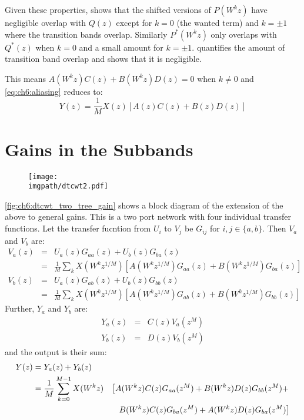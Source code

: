 Given these properties, \cite[figure 5]{kingsbury_complex_2001} shows that the
shifted versions of $P(W^k z)$ have negligible overlap with $Q(z)$ except for
$k=0$ (the wanted term) and $k=\pm 1$ where the transition bands overlap.
Similarly $P^*(W^k z)$ only overlaps with $Q^*(z)$ when $k=0$ and a small amount
for $k = \pm 1$. \cite{kingsbury_complex_2001} quantifies the amount of transition
band overlap and shows that it is negligible.

This means $A(W^k z)C(z) + B(W^k z)D(z) = 0$ when $k\neq 0$ and 
\eqref{eq:ch6:aliasing} reduces to:
\begin{equation}
  Y(z) =  \frac{1}{M} X(z)\left[ A(z)C(z) + B(z)D(z) \right]
  \label{eq:ch6:aliasing_cancel} 
\end{equation}

\section{Gains in the Subbands}
\begin{figure}[t]
  \centering
  \texttt{[image: \\imgpath/dtcwt2.pdf]}
  \label{fig:ch6:dtcwt_two_tree_gain}
\end{figure}

\autoref{fig:ch6:dtcwt_two_tree_gain} shows a block diagram of the extension of 
the above to general gains. This is a two port network with four individual
transfer functions. Let the transfer fucntion from $U_i$ to $V_j$
be $G_{ij}$ for $i, j \in \{a, b\}$. Then $V_a$ and $V_b$ are:
\begin{eqnarray}
  V_a(z) &=& U_a(z)G_{aa}(z) + U_b(z)G_{ba}(z) \\
         &=& \frac{1}{M} \sum_k X(W^{k} z^{1/M}) \left[A(W^k z^{1/M})G_{aa}(z) +
             B(W^k z^{1/M}) G_{ba}(z) \right] \\
  V_b(z) &=& U_a(z)G_{ab}(z) + U_b(z)G_{bb}(z) \\
         &=& \frac{1}{M} \sum_k X(W^{k} z^{1/M}) \left[A(W^k z^{1/M})G_{ab}(z) +
             B(W^k z^{1/M}) G_{bb}(z) \right] 
\end{eqnarray}
%
Further, $Y_a$ and $Y_b$ are:
\begin{eqnarray}
  Y_a(z) &=& C(z)V_a(z^M) \\
  Y_b(z) &=& D(z)V_b(z^M)
\end{eqnarray}
%
and the output is their sum:
\begin{alignat}{2}
    Y(z) &= Y_{a}(z) + Y_{b}(z) \\
         &= \frac{1}{M} \sum_{k=0}^{M-1} X(W^k z) & \left[  A(W^kz)C(z)G_{aa}(z^M) + B(W^kz)D(z)G_{bb}(z^M) + \right. \nonumber \\
         &                                        & \left. \hphantom{[}  B(W^kz)C(z)G_{ba}(z^M) + A(W^kz)D(z)G_{ba}(z^M) \right] 
    \label{eq:ch6:transfer}
\end{alignat}

